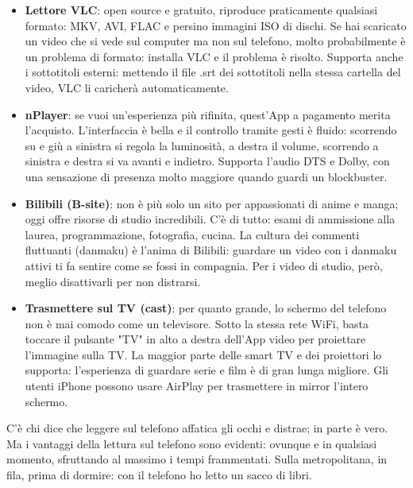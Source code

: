 \begin{itemize}
  \item \textbf{Lettore VLC}: open source e gratuito, riproduce praticamente qualsiasi formato: MKV, AVI, FLAC e persino immagini ISO di dischi. Se hai scaricato un video che si vede sul computer ma non sul telefono, molto probabilmente è un problema di formato: installa VLC e il problema è risolto. Supporta anche i sottotitoli esterni: mettendo il file .srt dei sottotitoli nella stessa cartella del video, VLC li caricherà automaticamente.
  \item \textbf{nPlayer}: se vuoi un'esperienza più rifinita, quest'App a pagamento merita l'acquisto. L'interfaccia è bella e il controllo tramite gesti è fluido: scorrendo su e giù a sinistra si regola la luminosità, a destra il volume, scorrendo a sinistra e destra si va avanti e indietro. Supporta l'audio DTS e Dolby, con una sensazione di presenza molto maggiore quando guardi un blockbuster.
  \item \textbf{Bilibili (B-site)}: non è più solo un sito per appassionati di anime e manga; oggi offre risorse di studio incredibili. C'è di tutto: esami di ammissione alla laurea, programmazione, fotografia, cucina. La cultura dei commenti fluttuanti (danmaku) è l'anima di Bilibili: guardare un video con i danmaku attivi ti fa sentire come se fossi in compagnia. Per i video di studio, però, meglio disattivarli per non distrarsi.
  \item \textbf{Trasmettere sul TV (cast)}: per quanto grande, lo schermo del telefono non è mai comodo come un televisore. Sotto la stessa rete WiFi, basta toccare il pulsante "TV" in alto a destra dell'App video per proiettare l'immagine sulla TV. La maggior parte delle smart TV e dei proiettori lo supporta: l'esperienza di guardare serie e film è di gran lunga migliore. Gli utenti iPhone possono usare AirPlay per trasmettere in mirror l'intero schermo.
\end{itemize}


C'è chi dice che leggere sul telefono affatica gli occhi e distrae; in parte è vero. Ma i vantaggi della lettura sul telefono sono evidenti: ovunque e in qualsiasi momento, sfruttando al massimo i tempi frammentati. Sulla metropolitana, in fila, prima di dormire: con il telefono ho letto un sacco di libri.

